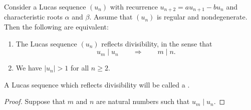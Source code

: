 \begin{theorem}
  Consider a Lucas sequence $(u_n)$ with recurrence $u_{n+2}=au_{n+1}-bu_n$ and characteristic roots $\alpha$ and $\beta$. Assume that $(u_n)$ is regular and nondegenerate. Then the following are equivalent:
  \begin{enumerate}
  \item The Lucas sequence $(u_n)$ reflects divisibility, in the sense that
    \begin{equation*}
      u_m\mid u_n\qquad\Rightarrow\qquad m\mid n.
    \end{equation*}
  \item We have $|u_n|>1$ for all $n\geq 2$.
  \end{enumerate}
  A Lucas sequence which reflects divisibility will be called a .
\end{theorem}

\begin{proof}
  Suppose that $m$ and $n$ are natural numbers such that $u_m\mid u_n$. 
\end{proof}

